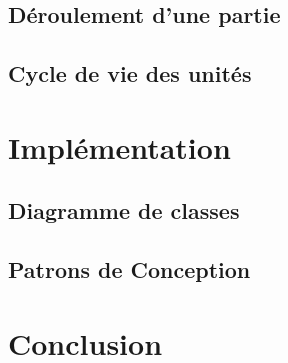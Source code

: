 \documentclass[12pt]{article}
\begin{document}
\subsection{Déroulement d'une partie}	\label{sec:deroulementPartie}
\subsection{Cycle de vie des unités}	\label{sec:cycleVieUnites}
\newpage

\section{Implémentation}			\label{sec:implementation}
\subsection{Diagramme de classes}	\label{sec:diagrammeClasses}		
\subsection{Patrons de Conception}	\label{sec:patronsConception}		
\newpage

\section{Conclusion} 			\label{sec:conclusion}			
\end{document}
